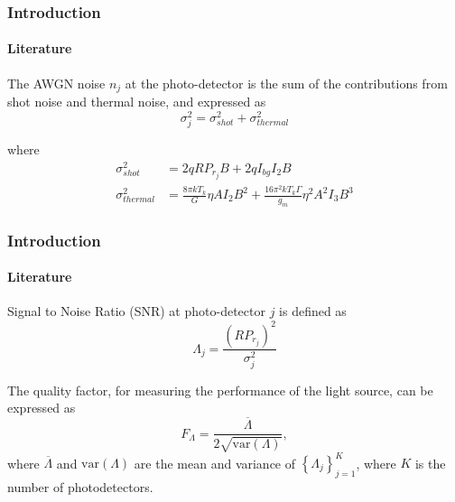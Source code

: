 \documentclass{beamer}
\providecommand{\brak}[1]{\ensuremath{\left(#1\right)}}
\providecommand{\cbrak}[1]{\ensuremath{\left\{#1\right\}}}
\theoremstyle{remark}
\begin{document}
\begin{frame}
\frametitle{Introduction}
\framesubtitle{Literature}
\begin{list}{} {}
\vfill
\item<1->The AWGN noise $n_j$ at the photo-detector is 
the sum of the contributions from shot noise and thermal noise, and expressed as %
%
\begin{equation}
\label{variance}
\sigma_j^2 = \sigma_{shot}^2+\sigma_{thermal}^2\nonumber
\end{equation}
\vfill
\item<2>where
\begin{equation}
\begin{split}
\sigma_{shot}^2 &= 2qRP_{r_j}B + 2q I_{bg} I_2 B \\
\sigma_{thermal}^2 &=\frac{8\pi kT_k}{G}\eta AI_2B^2 + \frac{16\pi^2kT_k\Gamma}{g_m}\eta^2 A^2I_3B^3
\end{split}\nonumber
\end{equation}
\vfill
\end{list}
\end{frame}
%
\begin{frame}
\frametitle{Introduction}
\framesubtitle{Literature}

\begin{list}{} {}
\vfill
\item<1-> Signal to Noise Ratio (SNR) at photo-detector $j$ is defined as
\begin{equation}
\label{eq:snr}
\Lambda_j = \frac{\brak{RP_{r_j}}^2}{\sigma_j^2}  \nonumber
\end{equation}
\vfill
\item<2-> The quality factor, for measuring the performance  of the light source, can be expressed as
\begin{equation}
\label{quality}
F_{\Lambda}=\frac{\overline{\Lambda}}{2\sqrt{\text{var}(\Lambda)}}, \nonumber
\end{equation}
where 
  $\overline{\Lambda}$  and $\text{var}(\Lambda)$  are the mean and variance of $\cbrak{\Lambda_j}_{j=1}^{K}$, where $K$ is the number of photodetectors. 
\vfill
\end{list}
\end{frame}
\end{document}
